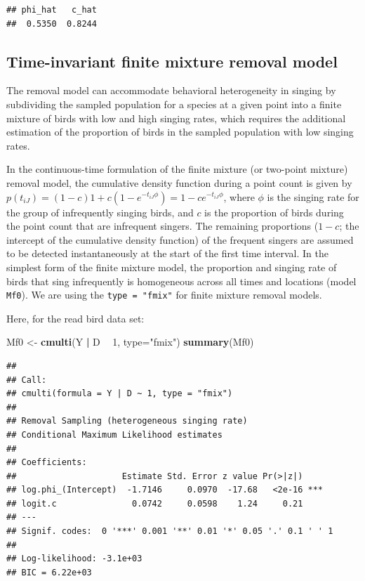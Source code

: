 \documentclass[12pt,]{book}
\newenvironment{Shaded}{\begin{snugshade}}{\end{snugshade}}
\newcommand{\DataTypeTok}[1]{\textcolor[rgb]{0.13,0.29,0.53}{#1}}
\newcommand{\DecValTok}[1]{\textcolor[rgb]{0.00,0.00,0.81}{#1}}
\newcommand{\KeywordTok}[1]{\textcolor[rgb]{0.13,0.29,0.53}{\textbf{#1}}}
\newcommand{\NormalTok}[1]{#1}
\newcommand{\OperatorTok}[1]{\textcolor[rgb]{0.81,0.36,0.00}{\textbf{#1}}}
\newcommand{\StringTok}[1]{\textcolor[rgb]{0.31,0.60,0.02}{#1}}
\begin{document}
\begin{verbatim}
## phi_hat   c_hat 
##  0.5350  0.8244
\end{verbatim}

\hypertarget{time-invariant-finite-mixture-removal-model}{%
\subsection{Time-invariant finite mixture removal model}\label{time-invariant-finite-mixture-removal-model}}

The removal model can accommodate behavioral heterogeneity in singing by subdividing the
sampled population for a species at a given point into a finite mixture of birds with low and
high singing rates, which requires the additional estimation of the proportion of birds in the
sampled population with low singing rates.

In the continuous-time formulation of the finite mixture (or two-point mixture) removal model,
the cumulative density function during a point count is given by
\(p(t_{iJ}) = (1 - c) 1 + c (1 - e^{-t_{iJ} \phi}) = 1 - c e^{-t_{iJ} \phi}\), where
\(\phi\) is the singing rate for the group of infrequently singing birds, and \(c\) is the
proportion of birds during the point count that are infrequent singers. The remaining
proportions (\(1 - c\); the intercept of the cumulative density function) of the frequent
singers are assumed to be detected instantaneously at the start of the first time interval.
In the simplest form of the finite mixture model, the proportion and singing rate of birds
that sing infrequently is homogeneous across all times and locations (model \texttt{Mf0}).
We are using the \texttt{type\ =\ "fmix"} for finite mixture removal models.

Here, for the read bird data set:

\begin{Shaded}
\begin{Highlighting}[]
\NormalTok{Mf0 <-}\StringTok{ }\KeywordTok{cmulti}\NormalTok{(Y }\OperatorTok{|}\StringTok{ }\NormalTok{D }\OperatorTok{~}\StringTok{ }\DecValTok{1}\NormalTok{, }\DataTypeTok{type=}\StringTok{"fmix"}\NormalTok{)}
\KeywordTok{summary}\NormalTok{(Mf0)}
\end{Highlighting}
\end{Shaded}

\begin{verbatim}
## 
## Call:
## cmulti(formula = Y | D ~ 1, type = "fmix")
## 
## Removal Sampling (heterogeneous singing rate)
## Conditional Maximum Likelihood estimates
## 
## Coefficients:
##                     Estimate Std. Error z value Pr(>|z|)    
## log.phi_(Intercept)  -1.7146     0.0970  -17.68   <2e-16 ***
## logit.c               0.0742     0.0598    1.24     0.21    
## ---
## Signif. codes:  0 '***' 0.001 '**' 0.01 '*' 0.05 '.' 0.1 ' ' 1 
## 
## Log-likelihood: -3.1e+03 
## BIC = 6.22e+03
\end{verbatim}
\end{document}
